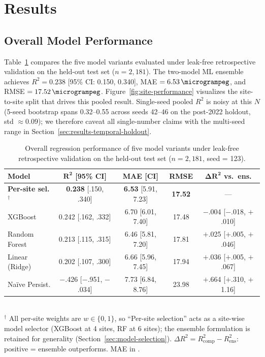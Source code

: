 \documentclass[toxins,article,submit,moreauthors]{Definitions/mdpi}
\begin{document}
\section{Results}
\label{sec:results}

\subsection{Overall Model Performance}
\label{sec:results-overall}

Table~\ref{tab:model-comparison} compares the five model variants evaluated under leak-free retrospective validation on the held-out test set ($n = 2{,}181$). The two-model ML ensemble achieves $R^2 = 0.238$ [95\% CI: 0.150, 0.340], MAE $= \SI{6.53}{\microgrampeg}$, and RMSE $= \SI{17.52}{\microgrampeg}$. Figure~\ref{fig:site-performance} visualizes the site-to-site split that drives this pooled result. Single-seed pooled $R^2$ is noisy at this $N$ (5-seed bootstrap spans 0.32--0.55 across seeds 42--46 on the post-2022 holdout, std $\approx 0.09$); we therefore caveat all single-number claims with the multi-seed range in Section~\ref{sec:results-temporal-holdout}.

\begin{table}[H]
\caption{Overall regression performance of five model variants under leak-free retrospective validation on the held-out test set ($n = 2{,}181$, seed = 123).}
\label{tab:model-comparison}
\centering\scriptsize
\begin{tabular*}{\linewidth}{@{\extracolsep{\fill}}lcccc}
\toprule
\textbf{Model} & $\boldsymbol{R^2}$ \textbf{[95\% CI]} & \textbf{MAE [CI]} & \textbf{RMSE} & $\boldsymbol{\Delta R^2}$ \textbf{vs.\ ens.} \\
\midrule
\textbf{Per-site sel.}$^{\dagger}$ & \textbf{0.238} [.150, .340] & \textbf{6.53} [5.91, 7.23] & \textbf{17.52} & --- \\
XGBoost          & 0.242 [.162, .332] & 6.70 [6.01, 7.40] & 17.48 & $-$.004 [$-$.018, $+$.010] \\
Random Forest    & 0.213 [.115, .315] & 6.46 [5.81, 7.20] & 17.81 & $+$.025 [$+$.005, $+$.046] \\
Linear (Ridge)   & 0.202 [.107, .300] & 6.66 [5.96, 7.45] & 17.94 & $+$.036 [$+$.005, $+$.067] \\
Na\"ive Persist. & $-$.426 [$-$.951, $-$.034] & 7.73 [6.84, 8.76] & 23.98 & $+$.664 [$+$.310, $+$1.16] \\
\bottomrule
\end{tabular*}
\vspace{0.3em}\\
\footnotesize{$^\dagger$ All per-site weights are $w \in \{0,1\}$, so ``Per-site selection'' acts as a site-wise model selector (XGBoost at 4 sites, RF at 6 sites); the ensemble formulation is retained for generality (Section~\ref{sec:model-selection}). $\Delta R^2 = R^2_{\text{comp}} - R^2_{\text{ens}}$: positive = ensemble outperforms. MAE in \si{\microgrampeg}.}
\end{table}
\end{document}
